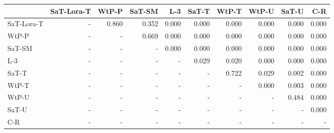 \begin{tabular}{lrrrrrrrrr}
\toprule
 & SaT-Lora-T & WtP-P & SaT-SM & L-3 & SaT-T & WtP-T & WtP-U & SaT-U & C-R \\
\midrule
SaT-Lora-T & - & 0.860 & 0.352 & 0.000 & 0.000 & 0.000 & 0.000 & 0.000 & 0.000 \\
WtP-P & - & - & 0.669 & 0.000 & 0.000 & 0.000 & 0.000 & 0.000 & 0.000 \\
SaT-SM & - & - & - & 0.000 & 0.000 & 0.000 & 0.000 & 0.000 & 0.000 \\
L-3 & - & - & - & - & 0.029 & 0.020 & 0.000 & 0.000 & 0.000 \\
SaT-T & - & - & - & - & - & 0.722 & 0.029 & 0.002 & 0.000 \\
WtP-T & - & - & - & - & - & - & 0.000 & 0.003 & 0.000 \\
WtP-U & - & - & - & - & - & - & - & 0.484 & 0.000 \\
SaT-U & - & - & - & - & - & - & - & - & 0.000 \\
C-R & - & - & - & - & - & - & - & - & - \\
\bottomrule
\end{tabular}

